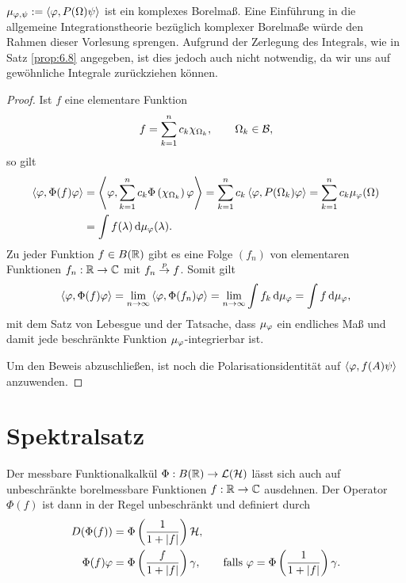 \begin{bem*}
$\mu_{\varphi,\psi}:= \left\langle\varphi,P(\Omega)\psi\right\rangle$ ist ein komplexes Borelmaß. Eine
Einführung in die allgemeine Integrationstheorie bezüglich komplexer Borelmaße
würde den Rahmen dieser Vorlesung sprengen. Aufgrund der Zerlegung des
Integrals, wie in Satz \ref{prop:6.8} angegeben, ist dies jedoch auch nicht
notwendig, da wir uns auf gewöhnliche Integrale zurückziehen können.\maphere
\end{bem*}

\begin{proof}
Ist $f$ eine elementare Funktion
\begin{align*}
f = \sum_{k=1}^n c_k \chi_{\Omega_k},\qquad \Omega_k\in\mathcal{B},
\end{align*}
so gilt
\begin{align*}
\left\langle\varphi,\Phi(f)\varphi\right\rangle &= \left\langle\varphi,\sum_{k=1}^n c_k
\Phi\left(\chi_{\Omega_k}\right)\varphi\right\rangle
= \sum_{k=1}^n c_k \left\langle\varphi,P(\Omega_k)\varphi\right\rangle
= \sum_{k=1}^n c_k \mu_{\varphi}(\Omega)\\
&= \int f(\lambda) \,\mathrm{d} \mu_\varphi(\lambda).
\end{align*}
Zu jeder Funktion $f\in B(\mathbb{R})$ gibt es eine Folge $(f_n)$ von elementaren
Funktionen $f_n : \mathbb{R}\to \mathbb{C}$ mit $f_n\overset{p}{\to} f$. Somit gilt
\begin{align*}
\left\langle\varphi,\Phi(f)\varphi\right\rangle = \lim\limits_{n\to\infty} \left\langle\varphi,\Phi(f_n)\varphi\right\rangle
= \lim\limits_{n\to\infty} \int f_k \,\mathrm{d} \mu_\varphi
= \int f\,\mathrm{d} \mu_\varphi,
\end{align*}
mit dem Satz von Lebesgue und der Tatsache, dass $\mu_\varphi$ ein endliches Maß
und damit jede beschränkte Funktion $\mu_\varphi$-integrierbar ist.

Um den Beweis abzuschließen, ist noch die Polarisationsidentität auf
$\left\langle\varphi,f(A)\psi\right\rangle$ anzuwenden.\qedhere
\end{proof}

\section{Spektralsatz}

Der messbare Funktionalkalkül $\Phi: B(\mathbb{R})\to \mathcal{L}(\mathcal{H})$ lässt sich auch auf
unbeschränkte borelmessbare Funktionen $f: \mathbb{R}\to\mathbb{C}$ ausdehnen. Der Operator
$\Phi(f)$ ist dann in der Regel unbeschränkt und definiert durch
\begin{align*}
D(\Phi(f)) &= \Phi\left(\frac{1}{1+\left|f\right|} \right)\mathcal{H},\\
\Phi(f)\varphi &= \Phi\left(\frac{f}{1+\left|f\right|} \right)\gamma,\qquad\text{falls }
\varphi = \Phi\left(\frac{1}{1+\left|f\right|} \right)\gamma.
\end{align*}

